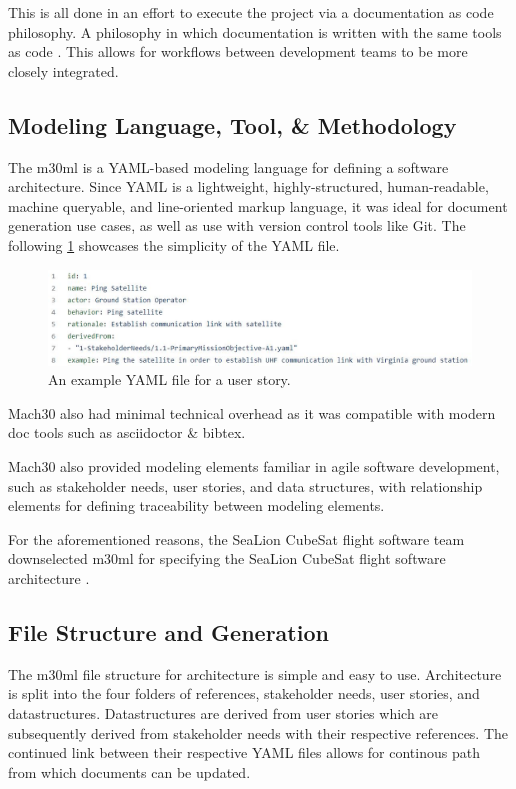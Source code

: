 \documentclass[conf]{new-aiaa}
\begin{document}
This is all done in an effort to execute the project via a documentation as code philosophy. A philosophy in which documentation is written with the same tools as code \cite{docs_as_code}. This allows for workflows between development teams to be more closely integrated.

\subsection{Modeling Language, Tool, & Methodology}

The m30ml is a YAML-based modeling language for defining a software architecture. Since YAML is a lightweight, highly-structured, human-readable, machine queryable, and line-oriented markup language, it was ideal for document generation use cases, as well as use with version control tools like Git. The following \ref{user_story} showcases the simplicity of the YAML file.

\begin{figure}[hbt!]
    \centering
    \includegraphics[width=.5\textwidth]{ping_satellite}
    \caption{An example YAML file for a user story.}
    \label{user_story}
\end{figure}

Mach30 also had minimal technical overhead as it was compatible with modern doc tools such as asciidoctor & bibtex.

Mach30 also provided modeling elements familiar in agile software development, such as stakeholder needs, user stories, and data structures, with relationship elements for defining traceability between modeling elements.

For the aforementioned reasons, the SeaLion CubeSat flight software team downselected m30ml for specifying the SeaLion CubeSat flight software architecture \cite{mach30_git}.

\subsection{File Structure and Generation}

The m30ml file structure for architecture is simple and easy to use. Architecture is split into the four folders of references, stakeholder needs, user stories, and datastructures. Datastructures are derived from user stories which are subsequently derived from stakeholder needs with their respective references. The continued link between their respective YAML files allows for continous path from which documents can be updated.
\end{document}
